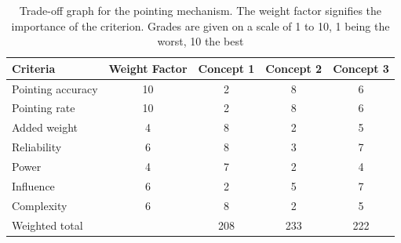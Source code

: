 \begin{table} [h]
\centering
\begin{tabular}{p{3cm} | c | c c c}
\textbf{Criteria} & \textbf{Weight Factor} & \textbf{Concept 1} & \textbf{Concept 2} & \textbf{Concept 3} \\ \hline \hline
Pointing accuracy & 10 & 2 & 8 & 6 \\
Pointing rate     & 10 & 2 & 8 & 6 \\
Added weight      & 4  & 8 & 2 & 5 \\
Reliability       & 6  & 8 & 3 & 7 \\
Power             & 4  & 7 & 2 & 4 \\
Influence         & 6  & 2 & 5 & 7\\
Complexity        & 6  & 8 & 2 & 5 \\ \hline
Weighted total    &    & 208 & 233 & 222
\end{tabular} 
\caption[Trade-off pointing mechanism]{Trade-off graph for the pointing mechanism. The weight factor signifies the importance of the criterion. Grades are given on a scale of 1 to 10, 1 being the worst, 10 the best}
\label{tab:pointingtradeoff}
\end{table}

